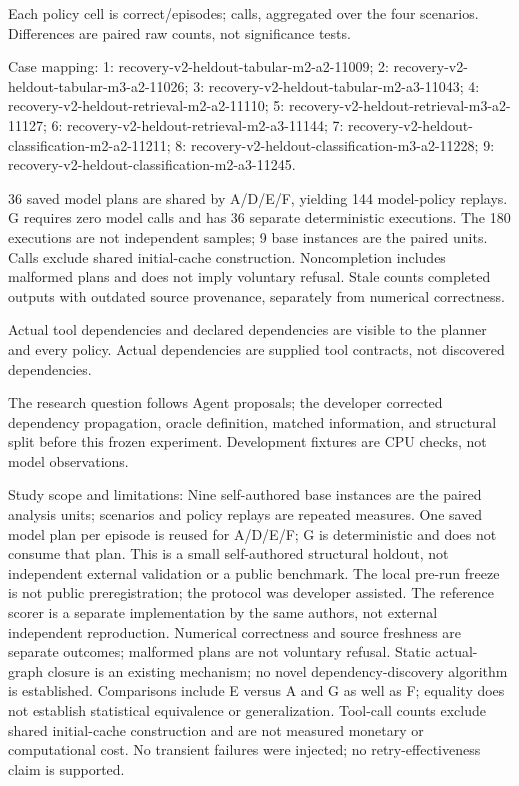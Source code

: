 \documentclass{article}
\begin{document}
Each policy cell is correct/episodes; calls, aggregated over the four scenarios. Differences are paired raw counts, not significance tests.

Case mapping: 1: recovery-v2-heldout-tabular-m2-a2-11009; 2: recovery-v2-heldout-tabular-m3-a2-11026; 3: recovery-v2-heldout-tabular-m2-a3-11043; 4: recovery-v2-heldout-retrieval-m2-a2-11110; 5: recovery-v2-heldout-retrieval-m3-a2-11127; 6: recovery-v2-heldout-retrieval-m2-a3-11144; 7: recovery-v2-heldout-classification-m2-a2-11211; 8: recovery-v2-heldout-classification-m3-a2-11228; 9: recovery-v2-heldout-classification-m2-a3-11245.

36 saved model plans are shared by A/D/E/F, yielding 144 model-policy replays. G requires zero model calls and has 36 separate deterministic executions. The 180 executions are not independent samples; 9 base instances are the paired units. Calls exclude shared initial-cache construction. Noncompletion includes malformed plans and does not imply voluntary refusal. Stale counts completed outputs with outdated source provenance, separately from numerical correctness.

Actual tool dependencies and declared dependencies are visible to the planner and every policy. Actual dependencies are supplied tool contracts, not discovered dependencies.

The research question follows Agent proposals; the developer corrected dependency propagation, oracle definition, matched information, and structural split before this frozen experiment. Development fixtures are CPU checks, not model observations.

Study scope and limitations: Nine self-authored base instances are the paired analysis units; scenarios and policy replays are repeated measures. One saved model plan per episode is reused for A/D/E/F; G is deterministic and does not consume that plan. This is a small self-authored structural holdout, not independent external validation or a public benchmark. The local pre-run freeze is not public preregistration; the protocol was developer assisted. The reference scorer is a separate implementation by the same authors, not external independent reproduction. Numerical correctness and source freshness are separate outcomes; malformed plans are not voluntary refusal. Static actual-graph closure is an existing mechanism; no novel dependency-discovery algorithm is established. Comparisons include E versus A and G as well as F; equality does not establish statistical equivalence or generalization. Tool-call counts exclude shared initial-cache construction and are not measured monetary or computational cost. No transient failures were injected; no retry-effectiveness claim is supported.
\end{document}
